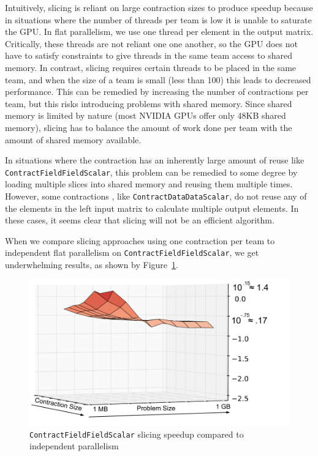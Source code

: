 Intuitively, slicing is reliant on large contraction
sizes to produce speedup because in situations where the number of threads per
team is low it is unable to saturate the GPU. In flat parallelism, we use one thread per
element in the output matrix. Critically, these threads are
not reliant one one another, so the GPU does not have to satisfy constraints to 
give threads in the same team access to shared memory. In contrast, slicing requires certain
threads to be placed in the same team, and when the size of a team is small (less than 100)
this leads to decreased performance. 
This can be remedied by increasing the number of contractions per team, but this risks introducing
problems with shared memory. Since shared memory is limited by nature (most NVIDIA GPUs offer only 48KB shared memory), slicing has to balance the amount of work done per team with the amount of shared memory
available.
	
    In situations where the contraction has an inherently large amount of reuse
like \texttt{ContractFieldFieldScalar}, this problem can be remedied to some degree by loading multiple slices into shared memory and reusing them multiple times. However, some 
contractions , like \texttt{ContractDataDataScalar}, do not reuse any of the elements in the left input matrix to
calculate multiple output elements. In these cases, it seems
clear that slicing will not be an efficient algorithm. 
	
When we compare slicing approaches using one contraction per team to
independent flat parallelism on \texttt{ContractFieldFieldScalar}, we get underwhelming
results, as shown by Figure~\ref{fig:CFFSSlicingVSIndepentent}. 

\begin{figure}[!ht] 
    \centering
    \includegraphics[scale = .4]{CFFS_Slicing}
    \caption[\texttt{ContractFieldFieldScalar} speedup over
    flat parallel]{\texttt{ContractFieldFieldScalar} slicing speedup compared to
    independent parallelism}
\label{fig:CFFSSlicingVSIndepentent}
\end{figure}


